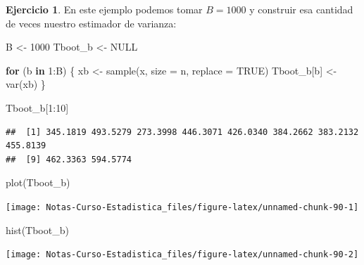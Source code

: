 \documentclass[
  12pt,
]{book}
\newenvironment{Shaded}{\begin{snugshade}}{\end{snugshade}}
\newcommand{\AttributeTok}[1]{\textcolor[rgb]{0.77,0.63,0.00}{#1}}
\newcommand{\ConstantTok}[1]{\textcolor[rgb]{0.00,0.00,0.00}{#1}}
\newcommand{\ControlFlowTok}[1]{\textcolor[rgb]{0.13,0.29,0.53}{\textbf{#1}}}
\newcommand{\DecValTok}[1]{\textcolor[rgb]{0.00,0.00,0.81}{#1}}
\newcommand{\FunctionTok}[1]{\textcolor[rgb]{0.00,0.00,0.00}{#1}}
\newcommand{\NormalTok}[1]{#1}
\newcommand{\OtherTok}[1]{\textcolor[rgb]{0.56,0.35,0.01}{#1}}
\newcommand{\SpecialCharTok}[1]{\textcolor[rgb]{0.00,0.00,0.00}{#1}}
\theoremstyle{definition}
\theoremstyle{definition}
\theoremstyle{definition}
\newtheorem{exercise}{Ejercicio}[chapter]
\theoremstyle{definition}
\theoremstyle{remark}
\begin{document}
\begin{exercise}
\protect\hypertarget{exr:unnamed-chunk-88}{}\label{exr:unnamed-chunk-88}En este ejemplo podemos tomar \(B=1000\) y construir esa cantidad de veces nuestro estimador de varianza:
\end{exercise}

\begin{Shaded}
\begin{Highlighting}[]
\NormalTok{B }\OtherTok{\textless{}{-}} \DecValTok{1000}
\NormalTok{Tboot\_b }\OtherTok{\textless{}{-}} \ConstantTok{NULL}

\ControlFlowTok{for}\NormalTok{ (b }\ControlFlowTok{in} \DecValTok{1}\SpecialCharTok{:}\NormalTok{B) \{}
\NormalTok{    xb }\OtherTok{\textless{}{-}} \FunctionTok{sample}\NormalTok{(x, }\AttributeTok{size =}\NormalTok{ n, }\AttributeTok{replace =} \ConstantTok{TRUE}\NormalTok{)}
\NormalTok{    Tboot\_b[b] }\OtherTok{\textless{}{-}} \FunctionTok{var}\NormalTok{(xb)}
\NormalTok{\}}

\NormalTok{Tboot\_b[}\DecValTok{1}\SpecialCharTok{:}\DecValTok{10}\NormalTok{]}
\end{Highlighting}
\end{Shaded}

\begin{verbatim}
##  [1] 345.1819 493.5279 273.3998 446.3071 426.0340 384.2662 383.2132 455.8139
##  [9] 462.3363 594.5774
\end{verbatim}

\begin{Shaded}
\begin{Highlighting}[]
\FunctionTok{plot}\NormalTok{(Tboot\_b)}
\end{Highlighting}
\end{Shaded}

\begin{center}\texttt{[image: Notas-Curso-Estadistica\_files/figure-latex/unnamed-chunk-90-1]} \end{center}

\begin{Shaded}
\begin{Highlighting}[]
\FunctionTok{hist}\NormalTok{(Tboot\_b)}
\end{Highlighting}
\end{Shaded}

\begin{center}\texttt{[image: Notas-Curso-Estadistica\_files/figure-latex/unnamed-chunk-90-2]} \end{center}
\end{document}
